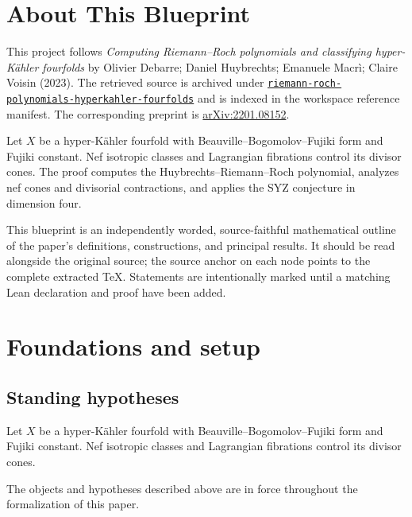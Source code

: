

\chapter*{About This Blueprint}
\label{riemann-roch-polynomials-hyperkahler-fourfolds-about}

This project follows \emph{Computing Riemann--Roch polynomials and classifying hyper-Kähler fourfolds} by Olivier Debarre; Daniel Huybrechts; Emanuele Macrì; Claire Voisin (2023). The
retrieved source is archived under
\href{../../../../../references/riemann-roch-polynomials-hyperkahler-fourfolds/}{\texttt{riemann-roch-polynomials-hyperkahler-fourfolds}} and is indexed in
the workspace reference manifest. The corresponding preprint is
\href{https://arxiv.org/abs/2201.08152}{arXiv:2201.08152}.

Let $X$ be a hyper-Kähler fourfold with Beauville--Bogomolov--Fujiki form and Fujiki constant. Nef isotropic classes and Lagrangian fibrations control its divisor cones. The proof computes the Huybrechts--Riemann--Roch polynomial, analyzes nef cones and divisorial contractions, and applies the SYZ conjecture in dimension four.

This blueprint is an independently worded, source-faithful mathematical
outline of the paper's definitions, constructions, and principal results. It
should be read alongside the original source; the source anchor on each node
points to the complete extracted TeX. Statements are intentionally marked
\notready until a matching Lean declaration and proof have been added.

\chapter{Foundations and setup}
\label{chap:riemann-roch-polynomials-hyperkahler-fourfolds-foundations}

\section{Standing hypotheses}
\label{sec:riemann-roch-polynomials-hyperkahler-fourfolds-standing}

Let $X$ be a hyper-Kähler fourfold with Beauville--Bogomolov--Fujiki form and Fujiki constant. Nef isotropic classes and Lagrangian fibrations control its divisor cones.

\begin{convention}
\label{riemann-roch-polynomials-hyperkahler-fourfolds-setup}
The objects and hypotheses described above are in force throughout the
formalization of this paper.
\notready
\end{convention}

